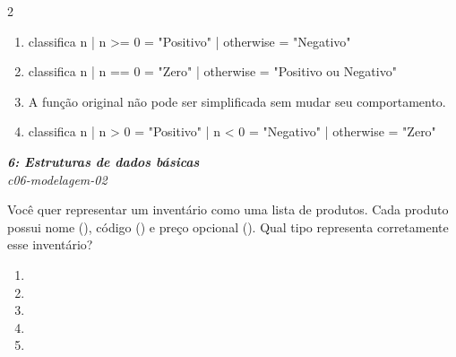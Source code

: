 \documentclass[a4paper,10pt,brazil]{article}
\begin{document}
\begin{multicols}{2}
\begin{enumerate}
  \item \begin{haskellcode}
classifica n
  | n >= 0    = "Positivo"
  | otherwise = "Negativo"
\end{haskellcode}

  \item \begin{haskellcode}
classifica n
  | n == 0    = "Zero"
  | otherwise = "Positivo ou Negativo"
\end{haskellcode}

  \item A função original não pode ser simplificada sem mudar seu comportamento.

  \item \begin{haskellcode}
classifica n
  | n > 0     = "Positivo"
  | n < 0     = "Negativo"
  | otherwise = "Zero"
\end{haskellcode}


\end{enumerate}

\begin{flushright}
  \footnotesize
  \textit{\textbf{6: Estruturas de dados básicas}}\\
  \textit{c06-modelagem-02}\\

\end{flushright}
Você quer representar um inventário como uma lista de produtos. Cada produto possui nome (), código () e preço opcional (). Qual tipo representa corretamente esse inventário?

\begin{enumerate}
  \item {}

  \item {}

  \item {}

  \item {}

  \item {}


\end{enumerate}


\end{multicols}
\end{document}
